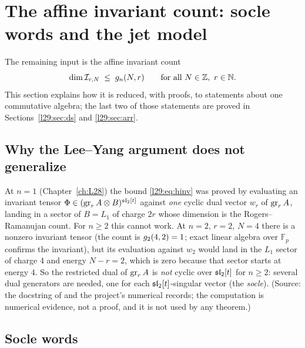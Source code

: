 \section{The affine invariant count: socle words and the jet model}\label{l29:sec:model}

The remaining input is the affine invariant count
\begin{equation}\label{l29:eq:hinv}
\dim\mathcal I_{r,N}\;\le\;g_n(N,r)\qquad\text{for all }N\in{\mathbb{Z}},\ r\in{\mathbb{N}}.
\end{equation}
This section explains how it is reduced, with proofs, to statements about one commutative algebra; the last two of
those statements are proved in Sections~\ref{l29:sec:ds} and \ref{l29:sec:arr}.

\subsection{Why the Lee--Yang argument does not generalize}

\begin{warning}[title={Dead end: one cyclic dual vector}]\label{l29:warn:cyclic}
At $n=1$ (Chapter~\ref{ch:L28}) the bound \eqref{l29:eq:hinv} was proved by evaluating an invariant tensor
$\Phi\in(\operatorname{gr}_rA\otimes B)^{\mathfrak{sl}_2[t]}$ against \emph{one} cyclic dual vector $w_r$ of
$\operatorname{gr}_rA$, landing in a sector of $B=L_1$ of charge $2r$ whose dimension is the Rogers--Ramanujan count. For
$n\ge2$ this cannot work. At $n=2$, $r=2$, $N=4$ there is a nonzero invariant tensor (the count is
$g_2(4,2)=1$; exact linear algebra over $\mathbb F_p$ confirms the invariant), but its evaluation against
$w_2$ would land in the $L_1$ sector of charge $4$ and energy $N-r=2$, which is zero because that sector starts at
energy $4$. So the restricted dual of $\operatorname{gr}_rA$ is \emph{not} cyclic over $\mathfrak{sl}_2[t]$ for $n\ge2$:
several dual generators are needed, one for each $\mathfrak{sl}_2[t]$-singular vector (the \emph{socle}). (Source:
the docstring of  and the project's numerical records; the
computation is numerical evidence, not a proof, and it is not used by any theorem.)
\end{warning}

\subsection{Socle words}

